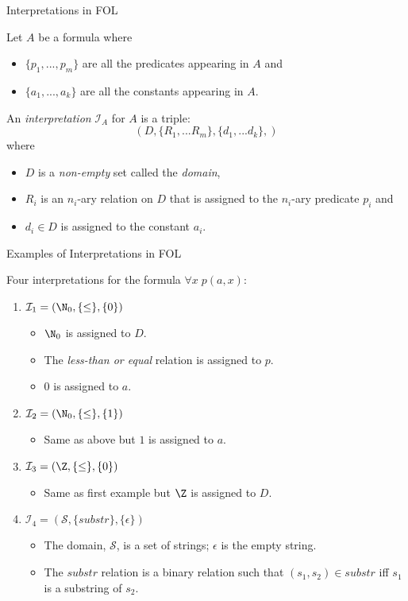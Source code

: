 \begin{wideslide}[bm=,toc=]{Interpretations in FOL}
\begin{defn}{7.16}
Let $A$ be a formula where 
\begin{itemize}
\item<2-> $\{p_1,...,p_m\}$ are all the predicates appearing in $A$ and 
\item<3-> $\{a_1,...,a_k\}$ are all the constants appearing in $A$.
\end{itemize}
\pause[3]
An \emph{interpretation} $\mathcal{I}_A$ for $A$ is a triple:
\pause
\[(D,\{R_1,...R_m\}, \{d_1,...d_k\},)\]
\pause
where 
\begin{itemize}
\item<6-> $D$ is a \emph{non-empty} set called the \emph{domain}, 
\item<7-> $R_i$ is an $n_i$-ary relation on $D$ that is assigned to the $n_i$-ary predicate
$p_i$ and 
\item<8-> $d_i \in D$ is assigned to the constant $a_i$.
\end{itemize}
\end{defn}
\end{wideslide}
\begin{wideslide}[bm=,toc=]{Examples of Interpretations in FOL}
\begin{ex}{7.17}
Four interpretations for the formula $\forall x \; p(a,x)$:
\end{ex}
\vspace*{-2ex}
\begin{enumerate}
\item<2-> $\mathcal{I}_1 = (\N_0,\{\leq\},\{0\})$
\begin{itemize}
\item<3-> $\N_0$ is assigned to $D$.
\item<3-> The \emph{less-than or equal} relation is assigned to $p$.
\item<3-> $0$ is assigned to $a$.
\end{itemize}
\item<4-> $\mathcal{I}_2 = (\N_0,\{\leq\},\{1\})$
\begin{itemize}
\item<5-> Same as above but $1$ is assigned to $a$. 
\end{itemize}
\item<6-> $\mathcal{I}_3 = (\Z,\{\leq\},\{0\})$
\begin{itemize}
\item<7-> Same as first example but $\Z$ is assigned to $D$. 
\end{itemize}
\item<8-> $\mathcal{I}_4 = (\mathcal{S},\{substr\},\{ \epsilon \})$
\begin{itemize}
\item The domain, $\mathcal{S}$, is a set of strings; $\epsilon$ is the empty string.
\item The $substr$ relation is a binary relation such that $(s_1,s_2) \in substr$
iff $s_1$ is a substring of $s_2$.
\end{itemize}

\end{enumerate}
\end{wideslide}


